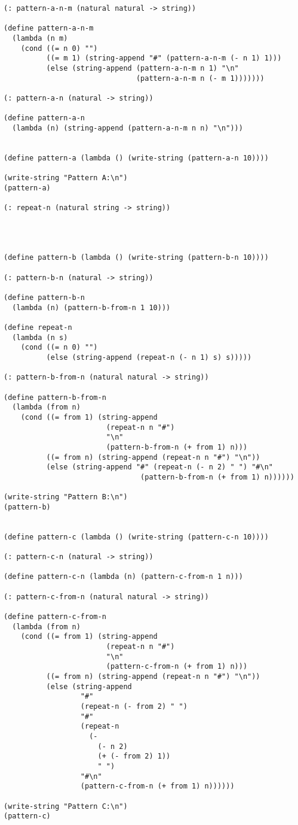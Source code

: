 \documentclass[a4paper,12pt]{article}
\begin{document}
\begin{verbatim}
(: pattern-a-n-m (natural natural -> string))

(define pattern-a-n-m
  (lambda (n m)
    (cond ((= n 0) "")
          ((= m 1) (string-append "#" (pattern-a-n-m (- n 1) 1)))
          (else (string-append (pattern-a-n-m n 1) "\n"
                               (pattern-a-n-m n (- m 1)))))))

(: pattern-a-n (natural -> string))

(define pattern-a-n
  (lambda (n) (string-append (pattern-a-n-m n n) "\n")))


(define pattern-a (lambda () (write-string (pattern-a-n 10))))

(write-string "Pattern A:\n")
(pattern-a)

(: repeat-n (natural string -> string))




(define pattern-b (lambda () (write-string (pattern-b-n 10))))

(: pattern-b-n (natural -> string))

(define pattern-b-n
  (lambda (n) (pattern-b-from-n 1 10)))

(define repeat-n
  (lambda (n s)
    (cond ((= n 0) "")
          (else (string-append (repeat-n (- n 1) s) s)))))

(: pattern-b-from-n (natural natural -> string))

(define pattern-b-from-n
  (lambda (from n)
    (cond ((= from 1) (string-append
                        (repeat-n n "#")
                        "\n"
                        (pattern-b-from-n (+ from 1) n)))
          ((= from n) (string-append (repeat-n n "#") "\n"))
          (else (string-append "#" (repeat-n (- n 2) " ") "#\n"
                                (pattern-b-from-n (+ from 1) n))))))

(write-string "Pattern B:\n")
(pattern-b)


(define pattern-c (lambda () (write-string (pattern-c-n 10))))

(: pattern-c-n (natural -> string))

(define pattern-c-n (lambda (n) (pattern-c-from-n 1 n)))

(: pattern-c-from-n (natural natural -> string))

(define pattern-c-from-n
  (lambda (from n)
    (cond ((= from 1) (string-append
                        (repeat-n n "#")
                        "\n"
                        (pattern-c-from-n (+ from 1) n)))
          ((= from n) (string-append (repeat-n n "#") "\n"))
          (else (string-append
                  "#"
                  (repeat-n (- from 2) " ")
                  "#"
                  (repeat-n
                    (-
                      (- n 2)
                      (+ (- from 2) 1))
                      " ")
                  "#\n"
                  (pattern-c-from-n (+ from 1) n))))))

(write-string "Pattern C:\n")
(pattern-c)
\end{verbatim}
\end{document}
